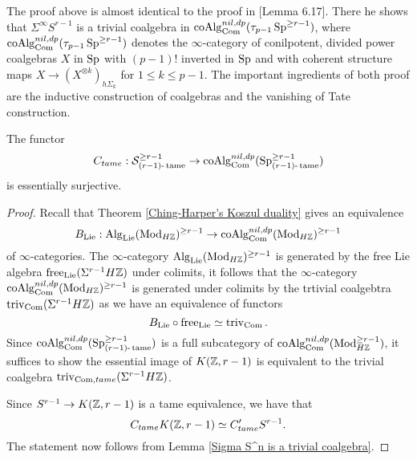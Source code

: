 \begin{remark}
	The proof above is almost identical to the proof in \cite{Heuts_Goodwillie}[Lemma 6.17]. 
	There he shows that $\Sigma^{\infty}S^{r-1}$ is a trivial coalgebra in $\operatorname{coAlg}^{nil, dp}_{\operatorname{Com}}(\tau_{p-1}\operatorname{Sp}^{\geq r-1})$,
	where $\operatorname{coAlg}^{nil, dp}_{\operatorname{Com}}(\tau_{p-1}\operatorname{Sp}^{\geq r-1})$ denotes the $\infty$-category of conilpotent, divided power coalgebras $X$ in $\operatorname{Sp}$ with $(p-1)!$ inverted in $\operatorname{Sp}$ and with coherent structure maps $X\to (X^{\otimes k})_{h\Sigma_k}$ for $1\leq k \leq p-1$. 
	The important ingredients of both proof are the inductive construction of coalgebras and the vanishing of Tate construction.
\end{remark}

\begin{lemma}
\label{Essential Surjectivity of C_tame}
	The functor 
	$$
	C_{tame}: {\mathcal{S}}^{\geq r-1}_{(r-1)\text{-}\operatorname{\operatorname{tame}}}  
	\to 
	\operatorname{coAlg}^{nil, dp}_{\operatorname{Com}}(\operatorname{Sp}^{\geq r-1}_{(r-1)\text{-}\operatorname{\operatorname{tame}}})
	$$
	is essentially surjective.
\end{lemma}
\begin{proof}
Recall that Theorem \ref{Ching-Harper's Koszul duality}
gives an equivalence
$$
B_{\operatorname{Lie}}: \operatorname{Alg}_{\operatorname{Lie}}(\operatorname{Mod}_{H{\mathbb{Z}}})^{\geq r-1} \to \operatorname{coAlg}^{nil, dp}_{\operatorname{Com}}(\operatorname{Mod}_{H{\mathbb{Z}}})^{\geq r-1}
$$
of $\infty$-categories. The $\infty$-category $\operatorname{Alg}_{\operatorname{Lie}}(\operatorname{Mod}_{H{\mathbb{Z}}})^{\geq r-1}$ is generated by the free Lie algebra $\operatorname{free}_{\operatorname{Lie}}(\Sigma^{r-1} H{\mathbb{Z}})$ under colimits,
 it follows that the $\infty$-category $\operatorname{coAlg}^{nil, dp}_{\operatorname{Com}}(\operatorname{Mod}_{H{\mathbb{Z}}})^{\geq r-1}$ is generated under colimits by the trtivial coalgebtra $\operatorname{triv}_{\operatorname{Com}}(\Sigma^{r-1}H {\mathbb{Z}})$ as we have an equivalence of functors
$$
B_{\operatorname{Lie}}\circ \operatorname{free}_{\operatorname{Lie}} \simeq \operatorname{triv}_{\operatorname{Com}}.
$$
Since $\operatorname{coAlg}^{nil, dp}_{\operatorname{Com}}(\operatorname{Sp}^{\geq r-1}_{(r-1)\text{-}\operatorname{\operatorname{tame}}})$ is a full subcategory of $\operatorname{coAlg}^{nil, dp}_{\operatorname{Com}}(\operatorname{Mod}_{H{\mathbb{Z}}}^{\geq r-1})$,
it suffices to show the essential image of $K({\mathbb{Z}}, r-1)$ is equivalent to the trivial coalgebra $\operatorname{triv}_{\operatorname{Com},tame}(\Sigma^{r-1}H {\mathbb{Z}})$.

Since $S^{r-1}\to K({\mathbb{Z}},r-1)$ is a tame equivalence, we have that
$$
C_{tame}K({\mathbb{Z}},r-1) \simeq C'_{tame} S^{r-1}.
$$
The statement now follows from Lemma \ref{Sigma S^n is a trivial coalgebra}.
\end{proof}






